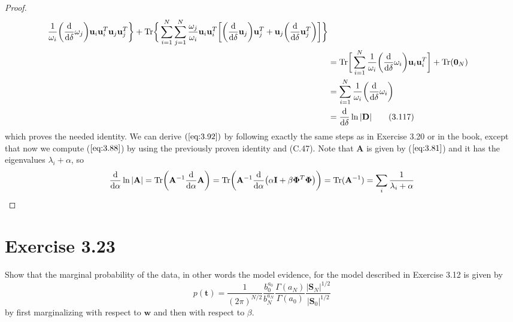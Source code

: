 \begin{proof}
\begin{align*}
            \frac{1}{\omega_i} \bigg(\dv{\delta}\omega_j\bigg) \mathbf{u}_i\mathbf{u}_i^T 
        \mathbf{u}_j\mathbf{u}_j^T \bigg\}
        + \text{Tr}\bigg\{\sum_{i=1}^{N} \sum_{j=1}^{N} 
            \frac{\omega_j}{\omega_i} \mathbf{u}_i\mathbf{u}_i^T
        \bigg[\bigg(\dv{\delta} \mathbf{u}_j\bigg)\mathbf{u}_j^T
        + \mathbf{u}_j\bigg(\dv{\delta}\mathbf{u}_j^T\bigg)\bigg]\bigg\} \\
        &= \text{Tr}\bigg[\sum_{i=1}^{N} \frac{1}{\omega_i}\bigg(\dv{\delta} \omega_i\bigg)
        \mathbf{u}_i\mathbf{u}_i^T\bigg] + \text{Tr}(\mathbf{0}_N) \\
        &= \sum_{i=1}^{N} \frac{1}{\omega_i} \bigg(\dv{\delta} \omega_i\bigg) \\
        &= \dv{\delta} \ln |\mathbf{D}| \tag{3.117}
    \end{align*}
    which proves the needed identity. We can derive $(\ref{eq:3.92})$ 
    by following exactly the same steps as in Exercise 3.20 or in the book,
    except that now we compute ($\ref{eq:3.88}$) by using the previously
    proven identity and (C.47). Note that $\mathbf{A}$ is given by ($\ref{eq:3.81}$)
    and it has the eigenvalues $\lambda_i + \alpha$, so
    \[
        \dv{\alpha}\ln |\mathbf{A}| 
        = \text{Tr}\bigg(\mathbf{A}^{-1}\dv{\alpha}\mathbf{A}\bigg)
        = \text{Tr}\bigg(\mathbf{A}^{-1}
            \dv{\alpha}(\alpha\mathbf{I} + \beta\mathbf{\Phi}^T\mathbf{\Phi})\bigg)
        = \text{Tr}(\mathbf{A}^{-1})
        = \sum_{i} \frac{1}{\lambda_i + \alpha} 
    \] 
\end{proof}

\section*{Exercise 3.23}
Show that the marginal probability of the data, in other words the model
evidence, for the model described in Exercise 3.12 is given by
\begin{equation}\label{eq:3.118}\tag{3.118}
    p(\mathbf{t}) = \frac{1}{(2\pi)^{N / 2}} \frac{b_0^{a_0}}{b_N^{a_N}}
    \frac{\Gamma(a_N)}{\Gamma(a_0)} \frac{|\mathbf{S}_N|^{1/2}}{|\mathbf{S}_0|^{1/2}}
\end{equation}
by first marginalizing with respect to $\mathbf{w}$ and then with
respect to $\beta$.

\vspace{1em}

